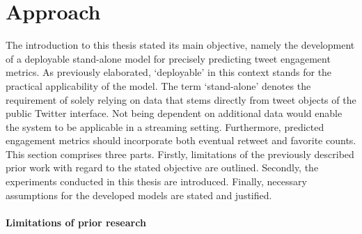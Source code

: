 \section{Approach}
\label{sec:approach}

The introduction to this thesis stated its main objective, namely the
development of a deployable stand-alone model for precisely predicting tweet
engagement metrics.
As previously elaborated, `deployable' in this context stands for the practical
applicability of the model.
The term `stand-alone' denotes the requirement of solely relying
on data that stems directly from tweet objects of the public Twitter interface.
Not being dependent on additional data would enable the system to be applicable
in a streaming setting.
Furthermore, predicted engagement metrics should incorporate both eventual
retweet and favorite counts.
This section comprises three parts.
Firstly, limitations of the previously described prior work with regard to the
stated objective are outlined.
Secondly, the experiments conducted in this thesis are introduced.
Finally, necessary assumptions for the developed models are stated and justified.

\paragraph{Limitations of prior research}


